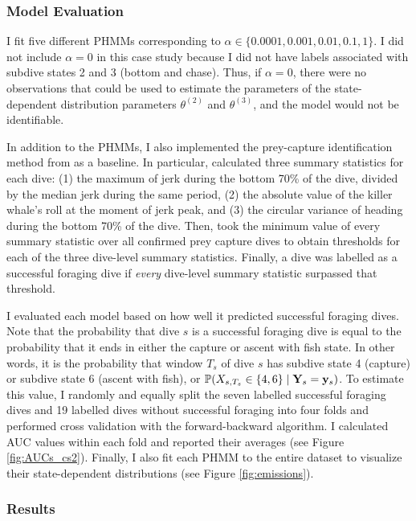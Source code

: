 \subsubsection{Model Evaluation}

I fit five different PHMMs corresponding to $\alpha \in \{0.0001,0.001,0.01,0.1,1\}$. I did not include $\alpha = 0$ in this case study because I did not have labels associated with subdive states 2 and 3 (bottom and chase). Thus, if $\alpha = 0$, there were no observations that could be used to estimate the parameters of the state-dependent distribution parameters $\theta^{(2)}$ and $\theta^{(3)}$, and the model would not be identifiable. 

In addition to the PHMMs, I also implemented the prey-capture identification method from \citet{Tennessen:2019a} as a baseline. In particular, \citet{Tennessen:2019a} calculated three summary statistics for each dive: (1) the maximum of jerk during the bottom 70\% of the dive, divided by the median jerk during the same period, (2) the absolute value of the killer whale's roll at the moment of jerk peak, and (3) the circular variance of heading during the bottom 70\% of the dive. Then, \citet{Tennessen:2019a} took the minimum value of every summary statistic over all confirmed prey capture dives to obtain thresholds for each of the three dive-level summary statistics. Finally, a dive was labelled as a successful foraging dive if \textit{every} dive-level summary statistic surpassed that threshold.

I evaluated each model based on how well it predicted successful foraging dives. Note that the probability that dive $s$ is a successful foraging dive is equal to the probability that it ends in either the capture or ascent with fish state. In other words, it is the probability that window $T_s$ of dive $s$ has subdive state 4 (capture) or subdive state 6 (ascent with fish), or $\mathbb{P}(X_{s,T_s} \in \{4,6\} \mid \mathbf{Y}_s = \mathbf{y}_s)$. To estimate this value, I randomly and equally split the seven labelled successful foraging dives and 19 labelled dives without successful foraging into four folds and performed cross validation with the forward-backward algorithm. I calculated AUC values within each fold and reported their averages (see Figure \ref{fig:AUCs_cs2}). Finally, I also fit each PHMM to the entire dataset to visualize their state-dependent distributions (see Figure \ref{fig:emissions}). 

\subsubsection{Results}

